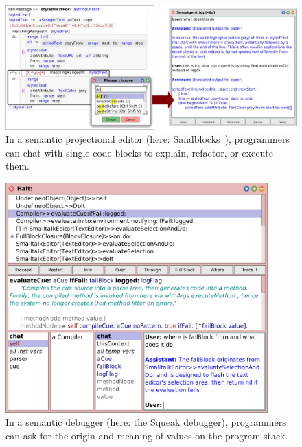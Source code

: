 \begin{figure}[Z]
	\centering
	\includegraphics[width=\linewidth]{chapters/08_application/03_system/editor.png}
	\caption[In a semantic projectional editor, programmers can chat with single code blocks to explain, refactor, or execute them.]{
		In a semantic projectional editor (here: Sandblocks~\cite{beckmann2020visual}), programmers can chat with single code blocks to explain, refactor, or execute them.
	}
	\label{fig:application/system/editor}
\end{figure}

\begin{figure}[p]
	\centering
	\includegraphics[width=0.9\textwidth]{chapters/08_application/03_system/debugger.png}
	\caption[In a semantic debugger, programmers can ask for the origin and meaning of values on the program stack.]{
		In a semantic debugger (here: the Squeak debugger), programmers can ask for the origin and meaning of values on the program stack.
	}
	\label{fig:application/system/debugger}
\end{figure}

